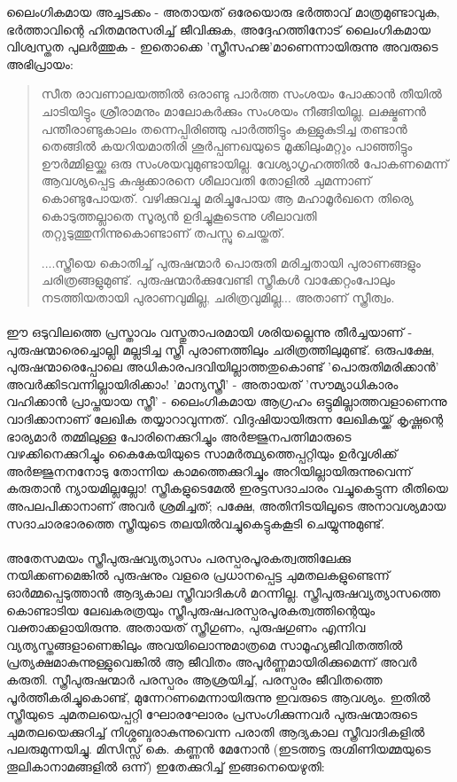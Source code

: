 ലൈംഗികമായ അച്ചടക്കം - അതായത് ഒരേയൊരു ഭർത്താവ് മാത്രമുണ്ടാവുക, ഭർത്താവിന്റെ ഹിതമനുസരിച്ച് ജീവിക്കുക, അദ്ദേഹത്തിനോട് ലൈംഗികമായ വിശ്വസ്തത പുലർത്തുക - ഇതൊക്കെ 'സ്ത്രീസഹജ'മാണെന്നായിരുന്നു അവരുടെ അഭിപ്രായം:
\begin{quotation}

\noindent

സീത രാവണാലയത്തിൽ ഒരാണ്ടു പാർത്ത സംശയം പോക്കാൻ തീയിൽ ചാടിയിട്ടും ശ്രീരാമനും മാലോകർക്കും സംശയം നീങ്ങിയില്ല. ലക്ഷ്മണൻ പന്തീരാണ്ടുകാലം തന്നെപ്പിരിഞ്ഞു പാർത്തിട്ടും കള്ളുകുടിച്ച തണ്ടാൻ തെങ്ങിൽ കയറിയമാതിരി ശൂർപ്പണഖയുടെ മൂക്കിലുംമറ്റും പാഞ്ഞിട്ടും ഊർമ്മിളയ്ക്കു ഒരു സംശയവുമുണ്ടായില്ല. വേശ്യാഗൃഹത്തിൽ പോകണമെന്ന് ആവശ്യപ്പെട്ട കുഷ്ഠക്കാരനെ ശീലാവതി തോളിൽ ചുമന്നാണ് കൊണ്ടുപോയത്. വഴിക്കുവച്ചു മരിച്ചുപോയ ആ മഹാമൂർഖനെ തിര്യെ കൊടുത്തല്ലാതെ സൂര്യൻ ഉദിച്ചുകൂടെന്നു ശീലാവതി തറ്റുടുത്തുനിന്നുകൊണ്ടാണ് തപസ്സു ചെയ്തത്.

\noindent
....സ്ത്രീയെ കൊതിച്ച് പുരുഷന്മാർ പൊരുതി മരിച്ചതായി പുരാണങ്ങളും ചരിത്രങ്ങളുമുണ്ട്. പുരുഷന്മാർക്കുവേണ്ടി സ്ത്രീകൾ വാക്കേറ്റംപോലും നടത്തിയതായി പുരാണവുമില്ല, ചരിത്രവുമില്ല... അതാണ് സ്ത്രീത്വം.
\end{quotation}

\paragraph{}
ഈ ഒടുവിലത്തെ പ്രസ്താവം വസ്തുതാപരമായി ശരിയല്ലെന്നു തീർച്ചയാണ് - പുരുഷന്മാരെച്ചൊല്ലി മല്ലടിച്ച സ്ത്രീ പുരാണത്തിലും ചരിത്രത്തിലുമുണ്ട്. ഒരുപക്ഷേ, പുരുഷന്മാരെപ്പോലെ അധികാരപദവിയില്ലാത്തതുകൊണ്ട് 'പൊരുതിമരിക്കാൻ' അവർക്കിടവന്നില്ലായിരിക്കാം! 'മാന്യസ്ത്രീ' - അതായത് 'സൗമ്യാധികാരം വഹിക്കാൻ പ്രാപ്തയായ സ്ത്രീ' - ലൈംഗികമായ ആഗ്രഹം ഒട്ടുമില്ലാത്തവളാണെന്നു വാദിക്കാനാണ് ലേഖിക തയ്യാറാവുന്നത്. വിദുഷിയായിരുന്ന ലേഖികയ്ക്ക് കൃഷ്ണന്റെ ഭാര്യമാർ തമ്മിലുള്ള പോരിനെക്കുറിച്ചും അർജ്ജുനപത്നിമാരുടെ വഴക്കിനെക്കുറിച്ചും കൈകേയിയുടെ സാമർത്ഥ്യത്തെപ്പറ്റിയും ഉർവ്വശിക്ക് അർജ്ജുനനനോടു തോന്നിയ കാമത്തെക്കുറിച്ചും അറിയില്ലായിരുന്നുവെന്ന് കരുതാൻ ന്യായമില്ലല്ലോ! സ്ത്രീകളുടെമേൽ ഇരട്ടസദാചാരം വച്ചുകെട്ടുന്ന രീതിയെ അപലപിക്കാനാണ് അവർ ശ്രമിച്ചത്; പക്ഷേ, അതിനിടയിലൂടെ അനാവശ്യമായ സദാചാരഭാരത്തെ സ്ത്രീയുടെ തലയിൽവച്ചുകെട്ടുകകൂടി ചെയ്യുന്നുമുണ്ട്.

\paragraph{}

അതേസമയം സ്ത്രീപുരുഷവ്യത്യാസം പരസ്പരപൂരകത്വത്തിലേക്കു നയിക്കണമെങ്കിൽ പുരുഷനും വളരെ പ്രധാനപ്പെട്ട ചുമതലകളുണ്ടെന്ന് ഓർമ്മപ്പെടുത്താൻ ആദ്യകാല സ്ത്രീവാദികൾ മറന്നില്ല. സ്ത്രീപുരുഷവ്യത്യാസത്തെ കൊണ്ടാടിയ ലേഖകരത്രയും സ്ത്രീപുരുഷപരസ്പരപൂരകത്വത്തിന്റെയും വക്താക്കളായിരുന്നു. അതായത് സ്ത്രീഗുണം, പുരുഷഗുണം എന്നിവ വ്യത്യസ്തങ്ങളാണെങ്കിലും അവയിലൊന്നുമാത്രമെ സാമൂഹ്യജീവിതത്തിൽ പ്രത്യക്ഷമാകുന്നുള്ളുവെങ്കിൽ ആ ജീവിതം അപൂർണ്ണമായിരിക്കുമെന്ന് അവർ കരുതി. സ്ത്രീപുരുഷന്മാർ പരസ്പരം ആശ്രയിച്ച്, പരസ്പരം ജീവിതത്തെ പൂർത്തീകരിച്ചുകൊണ്ട്, മുന്നേറണമെന്നായിരുന്നു ഇവരുടെ ആവശ്യം. ഇതിൽ സ്ത്രീയുടെ ചുമതലയെപ്പറ്റി ഘോരഘോരം പ്രസംഗിക്കുന്നവർ പുരുഷന്മാരുടെ ചുമതലയെക്കുറിച്ച് നിശ്ശബ്ദരാകുന്നുവെന്ന പരാതി ആദ്യകാല സ്ത്രീവാദികളിൽ പലരുമുന്നയിച്ചു. മിസിസ്സ് കെ. കണ്ണൻ മേനോൻ (ഇടത്തട്ട രുഗ്മിണിയമ്മയുടെ തൂലികാനാമങ്ങളിൽ ഒന്ന്) ഇതേക്കുറിച്ച് ഇങ്ങനെയെഴുതി:

